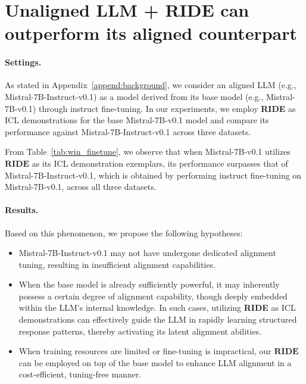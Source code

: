 \section{Unaligned LLM + \textbf{RIDE} can outperform its aligned counterpart}
\label{append:win_finetune}


\paragraph{Settings.}
As stated in Appendix~\ref{append:background}, we consider an aligned LLM (e.g., Mistral-7B-Instruct-v0.1) as a model derived from its base model (e.g., Mistral-7B-v0.1) through instruct fine-tuning. In our experiments, we employ \textbf{RIDE} as ICL demonstrations for the base Mistral-7B-v0.1 model and compare its performance against Mistral-7B-Instruct-v0.1 across three datasets.

From Table~\ref{tab:win_finetune}, we observe that when Mistral-7B-v0.1 utilizes $\textbf{RIDE}$ as its ICL demonstration exemplars, its performance surpasses that of Mistral-7B-Instruct-v0.1, which is obtained by performing instruct fine-tuning on Mistral-7B-v0.1, across all three datasets.

\paragraph{Results.} Based on this phenomenon, we propose the following hypotheses:
\begin{itemize}
\item Mistral-7B-Instruct-v0.1 may not have undergone dedicated alignment tuning, resulting in insufficient alignment capabilities.
\item When the base model is already sufficiently powerful, it may inherently possess a certain degree of alignment capability, though deeply embedded within the LLM’s internal knowledge. In such cases, utilizing \textbf{RIDE} as ICL demonstrations can effectively guide the LLM in rapidly learning structured response patterns, thereby activating its latent alignment abilities.
\item When training resources are limited or fine-tuning is impractical, our $\textbf{RIDE}$ can be employed on top of the base model to enhance LLM alignment in a cost-efficient, tuning-free manner.
\end{itemize}



